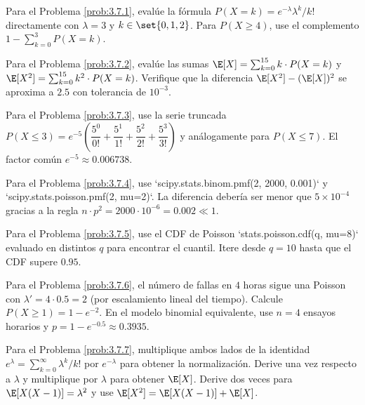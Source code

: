 \begin{sugerencia}
	\label{sug:3.7.1}
	Para el Problema \ref{prob:3.7.1}, evalúe la fórmula $P(X=k) = e^{-\lambda}\lambda^{k}/k!$ directamente con $\lambda = 3$ y $k \in \set{0, 1, 2}$. Para $P(X \ge 4)$, use el complemento $1 - \sum_{k=0}^{3} P(X=k)$.
\end{sugerencia}

\begin{sugerencia}
	\label{sug:3.7.2}
	Para el Problema \ref{prob:3.7.2}, evalúe las sumas $\E[X] = \sum_{k=0}^{15} k \cdot P(X=k)$ y $\E[X^{2}] = \sum_{k=0}^{15} k^{2} \cdot P(X=k)$. Verifique que la diferencia $\E[X^{2}] - (\E[X])^{2}$ se aproxima a $2.5$ con tolerancia de $10^{-3}$.
\end{sugerencia}

\begin{sugerencia}
	\label{sug:3.7.3}
	Para el Problema \ref{prob:3.7.3}, use la serie truncada $P(X \le 3) = e^{-5}\left(\dfrac{5^{0}}{0!} + \dfrac{5^{1}}{1!} + \dfrac{5^{2}}{2!} + \dfrac{5^{3}}{3!}\right)$ y análogamente para $P(X \le 7)$. El factor común $e^{-5} \approx 0.006738$.
\end{sugerencia}

\begin{sugerencia}
	\label{sug:3.7.4}
	Para el Problema \ref{prob:3.7.4}, use `scipy.stats.binom.pmf(2, 2000, 0.001)` y `scipy.stats.poisson.pmf(2, mu=2)`. La diferencia debería ser menor que $5 \times 10^{-4}$ gracias a la regla $n \cdot p^{2} = 2000 \cdot 10^{-6} = 0.002 \ll 1$.
\end{sugerencia}

\begin{sugerencia}
	\label{sug:3.7.5}
	Para el Problema \ref{prob:3.7.5}, use el CDF de Poisson `stats.poisson.cdf(q, mu=8)` evaluado en distintos $q$ para encontrar el cuantil. Itere desde $q = 10$ hasta que el CDF supere $0.95$.
\end{sugerencia}

\begin{sugerencia}
	\label{sug:3.7.6}
	Para el Problema \ref{prob:3.7.6}, el número de fallas en $4$ horas sigue una Poisson con $\lambda' = 4 \cdot 0.5 = 2$ (por escalamiento lineal del tiempo). Calcule $P(X \ge 1) = 1 - e^{-2}$. En el modelo binomial equivalente, use $n=4$ ensayos horarios y $p = 1 - e^{-0.5} \approx 0.3935$.
\end{sugerencia}

\begin{sugerencia}
	\label{sug:3.7.7}
	Para el Problema \ref{prob:3.7.7}, multiplique ambos lados de la identidad $e^{\lambda} = \sum_{k=0}^{\infty} \lambda^{k}/k!$ por $e^{-\lambda}$ para obtener la normalización. Derive una vez respecto a $\lambda$ y multiplique por $\lambda$ para obtener $\E[X]$. Derive dos veces para $\E[X(X-1)] = \lambda^{2}$ y use $\E[X^{2}] = \E[X(X-1)] + \E[X]$.
\end{sugerencia}

